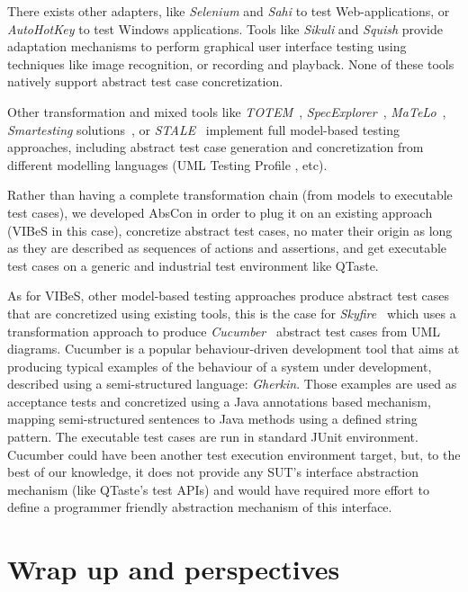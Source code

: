 There exists other adapters, like \emph{Selenium} and \emph{Sahi} \cite{sahi} to test Web-applications, or \emph{AutoHotKey} \cite{ahk} to test Windows applications. Tools like \emph{Sikuli} \cite{sikuli} and \emph{Squish} \cite{squish} provide adaptation mechanisms to perform graphical user interface testing using techniques like image recognition, or recording and playback. None of these tools natively support abstract test case \gls{concretization}.

Other transformation and mixed tools like \emph{TOTEM}~\cite{Briand2001}, \emph{SpecExplorer}~\cite{Veanes2008}, \emph{MaTeLo}~\cite{Dulz2003}, \emph{Smartesting} solutions~\cite{smartesting}, or \emph{STALE}~\cite{Li2015} implement full model-based testing approaches, including abstract test case generation and concretization from different modelling languages (\eg UML Testing Profile \cite{Williams2007}, etc). 

Rather than having a complete transformation chain (from models to executable test cases), we developed AbsCon in order to plug it on an existing approach (VIBeS in this case), concretize abstract test cases, no mater their origin as long as they are described as sequences of actions and assertions, and get executable test cases on a generic and industrial test environment like QTaste.

As for VIBeS, other model-based testing approaches produce abstract test cases that are concretized using existing tools, this is the case for \emph{Skyfire}~\cite{Li2016a} which uses a transformation approach to produce \emph{Cucumber}~\cite{cucumber} abstract test cases from UML diagrams. Cucumber is a popular behaviour-driven development tool that aims at producing typical examples of the behaviour of a system under development, described using a semi-structured language: \emph{Gherkin}. Those examples are used as acceptance tests and concretized using a Java annotations based mechanism, mapping semi-structured sentences to Java methods using a defined string pattern. The executable test cases are run in standard JUnit environment. 
%
Cucumber could have been another test execution environment target, but, to the best of our knowledge, it does not provide any SUT's interface abstraction mechanism (like QTaste's test APIs) and would have required more effort to define a programmer friendly abstraction mechanism of this interface.


\section{Wrap up and perspectives}

